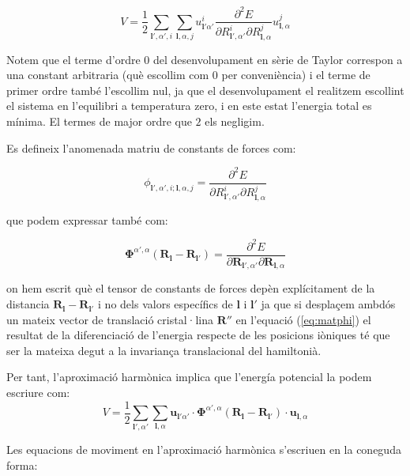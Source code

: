 \documentclass[12pt]{article} %
\let\vec\mathbf %
\begin{document}
\begin{equation}
 V=\frac{1}{2}\sum_{\vec l',\alpha',i}\sum_{\vec l,\alpha,j}u_{\vec l'\alpha'}^i\frac{\partial^2E}{\partial R_{\vec l',\alpha'}^i \partial R_{\vec l,\alpha}^j} u_{\vec l,\alpha}^j
\end{equation}

Notem que el terme d'ordre $0$ del desenvolupament en sèrie de Taylor correspon a una constant arbitraria (què escollim com $0$ per conveniència) i el terme de primer ordre també l'escollim nul, ja que el desenvolupament el realitzem escollint el sistema en l'equilibri a temperatura zero, i en este estat l'energia total es mínima. El termes de major ordre que $2$ els negligim.

Es defineix l'anomenada matriu de constants de forces com:

\begin{equation}
 \label{eq:matphi}
 \phi_{\vec l',\alpha',i;\vec l,\alpha,j}=\frac{\partial^2E}{\partial R_{\vec l',\alpha'}^i \partial R_{\vec l,\alpha}^j}
\end{equation}

que podem expressar també com:

\begin{equation}
 \label{eq:matphi2}
 \mathbf\Phi^{\alpha',\alpha}(\vec R_{\vec l}-\vec R_{\vec l'})=\frac{\partial^2E}{\partial \vec R_{\vec l',\alpha'} \partial \vec R_{\vec l,\alpha}}
\end{equation}

on hem escrit què el tensor de constants de forces depèn explícitament de la distancia  $\vec R_{\vec l}-\vec R_{\vec l'}$ i no dels valors específics de $\vec l$ i $\vec l'$ ja que si desplaçem ambdós un mateix vector de translació cristal·lina $\vec R''$ en l'equació (\ref{eq:matphi}) el resultat de la diferenciació de l'energia respecte de les posicions iòniques té que ser la mateixa degut a la invariança translacional del hamiltonià.

Per tant, l'aproximació harmònica implica que l'energía potencial la podem escriure com:
\begin{equation}\boxed{
 V=\frac{1}{2}\sum_{\vec l',\alpha'}\sum_{\vec l,\alpha}\vec u_{\vec l'\alpha'}\cdot\vec\Phi^{\alpha',\alpha}(\vec R_{\vec l}-\vec R_{\vec l'})\cdot\vec u_{\vec l,\alpha}}
\end{equation}

Les equacions de moviment en l'aproximació harmònica s'escriuen en la coneguda forma:
\end{document}
